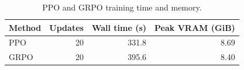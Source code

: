 \begin{table}[!htbp]
\centering

\scriptsize
\begin{tabular}{lrrr}
\toprule
Method & Updates & Wall time (s) & Peak VRAM (GiB) \\
\midrule
PPO & 20 & 331.8 & 8.69 \\
GRPO & 20 & 395.6 & 8.40 \\
\bottomrule
\end{tabular}

\caption{PPO and GRPO training time and memory.}
\label{tab:training-compute}

\end{table}
